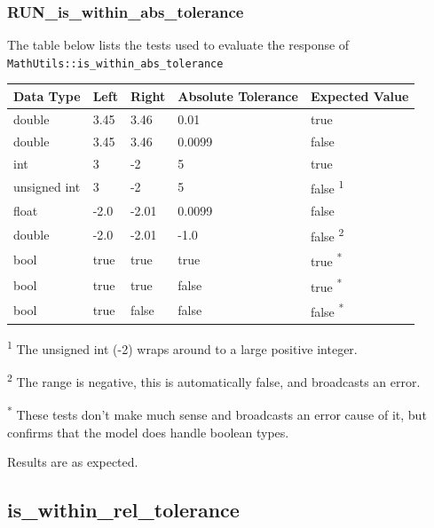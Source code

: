\documentclass[11pt,fleqn]{report}
\begin{document}
\subsubsection{RUN\_is\_within\_abs\_tolerance}
The table below lists the tests used to evaluate the response of \\
\texttt{MathUtils::is\_within\_abs\_tolerance}
\begin{center}
\begin{tabular}{|l||l|l|l|l|}
\hline
 \textbf{Data Type} & \textbf{Left} & \textbf{Right} &
 \textbf{Absolute Tolerance} & \textbf {Expected Value} \\
\hline \hline
double & 3.45 & 3.46 & 0.01 & true \\
double & 3.45 & 3.46 & 0.0099 & false \\
int& 3 & -2 & 5 & true \\
unsigned int & 3 & -2 & 5 & false \textsuperscript{1} \\
float & -2.0 & -2.01 & 0.0099 & false \\
double & -2.0 & -2.01 & -1.0 & false \textsuperscript{2} \\
bool &true & true & true & true \textsuperscript{*}\\
bool &true & true & false & true \textsuperscript{*}\\
bool &true & false & false & false \textsuperscript{*}\\
\hline \hline
\end{tabular}
\end{center}

\textsuperscript{1} The unsigned int (-2) wraps around to a large positive
integer.

\textsuperscript{2} The range is negative, this is automatically false, and 
broadcasts an error.

\textsuperscript{*} These tests don't make much sense and broadcasts an error
cause of it, but confirms that the model does handle boolean types.

Results are as expected.

\subsection{is\_within\_rel\_tolerance}
\end{document}
